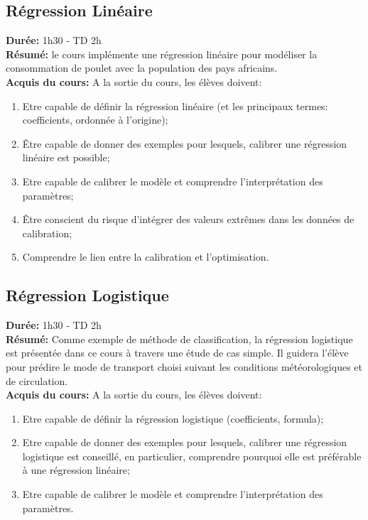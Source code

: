 \documentclass[12pt,a4paper]{article}
\begin{document}
\subsection{Régression Linéaire}

\textbf{Durée:} 1h30 - TD 2h\\
\textbf{Résumé:} le cours implémente une régression linéaire pour modéliser la consommation de poulet avec la population des pays africains. \\
\textbf{Acquis du cours:} A la sortie du cours, les élèves doivent:
\begin{enumerate}
\item Etre capable de définir la régression linéaire (et les principaux termes: coefficients, ordonnée à l’origine); 
\item Être capable de donner des exemples pour lesquels, calibrer une régression linéaire est possible;
\item Etre capable de calibrer le modèle et comprendre l’interprétation des paramètres;
\item Être conscient du risque d’intégrer des valeurs extrêmes dans les données de calibration;
\item Comprendre le lien entre la calibration et l’optimisation.
\end{enumerate}

\subsection{Régression Logistique}

\textbf{Durée:} 1h30 - TD 2h\\
\textbf{Résumé:} Comme exemple de méthode de classification, la régression logistique est présentée dans ce cours à travers une étude de cas simple. Il guidera l’élève pour prédire le mode de transport choisi suivant les conditions météorologiques et de circulation. \\
\textbf{Acquis du cours:} A la sortie du cours, les élèves doivent:
\begin{enumerate}
\item Etre capable de définir la régression logistique (coefficients, formula); 
\item Etre capable de donner des exemples pour lesquels, calibrer une régression logistique est conseillé, en particulier, comprendre pourquoi elle est préférable à une régression linéaire;
\item Etre capable de calibrer le modèle et comprendre l’interprétation des paramètres.
\end{enumerate}
\end{document}
